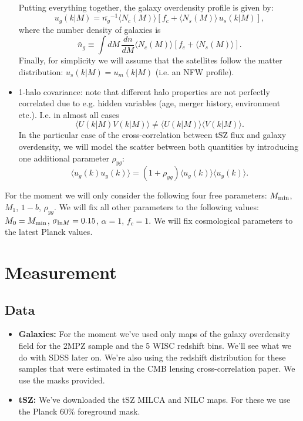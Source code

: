 \documentclass{article}
\begin{document}
\begin{itemize}
              Putting everything together, the galaxy overdensity profile is given by:
              \begin{equation}
                u_g(k|M)=\bar{n_g}^{-1}\langle N_c(M)\rangle\left[f_c+\langle N_s(M)\rangle\,u_s(k|M)\right],
              \end{equation}
              where the number density of galaxies is
              \begin{equation}
                \bar{n}_g\equiv\int dM\,\frac{dn}{dM}\langle N_c(M)\rangle\left[f_c+\langle N_s(M)\rangle\right].
              \end{equation}
              Finally, for simplicity we will assume that the satellites follow the matter distribution: $u_s(k|M)=u_m(k|M)$ (i.e. an NFW profile).
        \item 1-halo covariance: note that different halo properties are not perfectly correlated due to e.g. hidden variables (age, merger history, environment etc.). I.e. in almost all cases
              \begin{equation}
                \langle U(k|M) V(k|M)\rangle\neq\langle U(k|M)\rangle\langle V(k|M)\rangle.
              \end{equation}
              In the particular case of the cross-correlation between tSZ flux and galaxy overdensity, we will model the scatter between both quantities by introducing one additional parameter $\rho_{yg}$:
              \begin{equation}
                \langle u_g(k) u_y(k)\rangle = (1+\rho_{yg})\langle u_g(k)\rangle \langle u_y(k)\rangle.
              \end{equation}
      \end{itemize}
      For the moment we will only consider the following four free parameters: $M_{\rm min}$, $M_1$, $1-b$, $\rho_{yg}$. We will fix all other parameters to the following values: $M_0=M_{\rm min}$, $\sigma_{{\rm ln}M}=0.15$, $\alpha=1$, $f_c=1$. We will fix cosmological parameters to the latest Planck values.

\section{Measurement}
  \subsection{Data}
    \begin{itemize}
      \item {\bf Galaxies:} For the moment we've used only maps of the galaxy overdensity field for the 2MPZ sample and the 5 WISC redshift bins. We'll see what we do with SDSS later on. We're also using the redshift distribution for these samples that were estimated in the CMB lensing cross-correlation paper. We use the masks provided.
      \item {\bf tSZ:} We've downloaded the tSZ MILCA and NILC maps. For these we use the Planck 60\% foreground mask.      
    \end{itemize}
\end{document}
